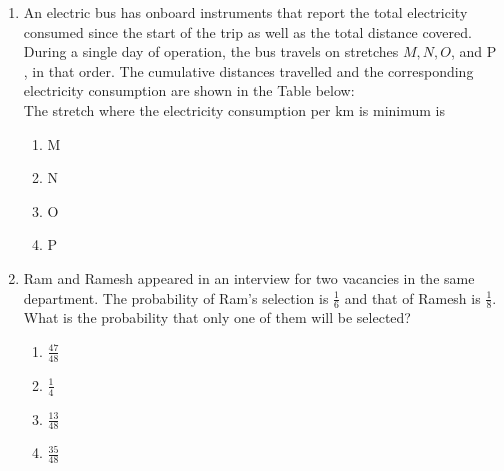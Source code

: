 \documentclass[journal]{IEEEtran}
\begin{document}
\begin{enumerate}
\section*{Misogynous}
 \hfill{}
\begin{multicols}{4}
    \begin{enumerate}
        \item   Misogynousness
        \item Misogynity
        \item  Misogynously
        \item Misogynous
    \end{enumerate}
\end{multicols}
\item An electric bus has onboard instruments that report the total electricity consumed since the start of the trip as well as the total distance covered. During a single day of operation, the bus travels on stretches ${M}, {N}, {O}$, and P , in that order. The cumulative distances travelled and the corresponding electricity consumption are shown in the Table below:
    \\
    The stretch where the electricity consumption per km is minimum is
     \hfill{}
\begin{multicols}{4}
    \begin{enumerate}
        \item M
        \item N
        \item O
        \item P
    \end{enumerate}
\end{multicols}
  
  \item Ram and Ramesh appeared in an interview for two vacancies in the same department. The probability of Ram's selection is $\frac{1} { 6}$ and that of Ramesh is $\frac{1} { 8}$. What is the probability that only one of them will be selected?
  \hfill{}
  \begin{multicols}{4}
			\begin{enumerate}
   \item $\frac{47}{48}$
\item $\frac{1}{4}$
\item $\frac{13}{48}$
\item  $\frac{35}{48}$
\end{enumerate}
		\end{multicols}
   

\end{enumerate}
\end{document}
